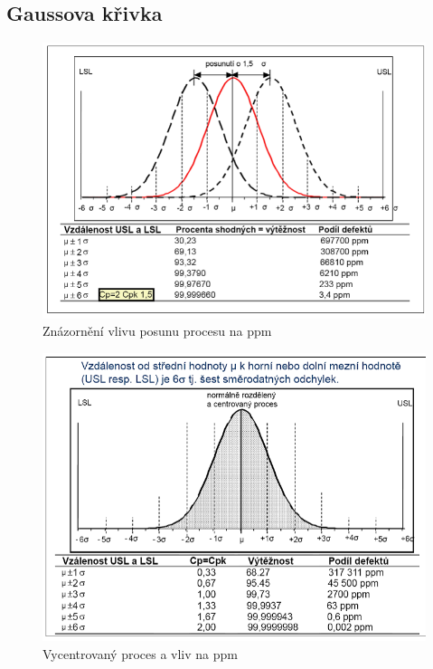 \subsection{Gaussova křivka}
\begin{figure}[h]
   \begin{center}
     \includegraphics[scale=0.5]{images/Normal1.png}
   \end{center}
   \caption{Znázornění vlivu posunu procesu na ppm}
\end{figure}
\begin{figure}[h]
   \begin{center}
     \includegraphics[scale=0.5]{images/Normal2.png}
   \end{center}
   \caption{Vycentrovaný proces a vliv na ppm}
\end{figure}
